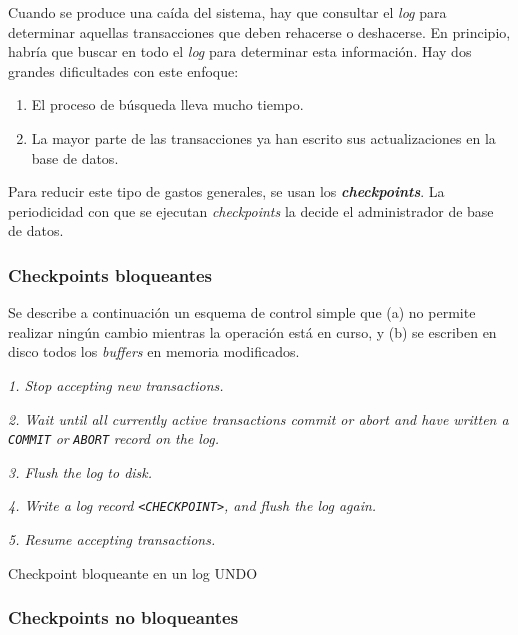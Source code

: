 \documentclass[a4paper, twoside]{article}
\begin{document}
Cuando se produce una caída del sistema, hay que consultar el \emph{log}
para determinar aquellas transacciones que deben rehacerse o deshacerse.
En principio, habría que buscar en todo el \emph{log} para determinar
esta información. Hay dos grandes dificultades con este enfoque: 
\begin{enumerate}
\item El proceso de búsqueda lleva mucho tiempo. 
\item La mayor parte de las transacciones ya han escrito sus actualizaciones
en la base de datos. 
\end{enumerate}
Para reducir este tipo de gastos generales, se usan los \textbf{\emph{checkpoints}}.
La periodicidad con que se ejecutan \emph{checkpoints} la decide el
administrador de base de datos.


\subsubsection{Checkpoints bloqueantes}

Se describe a continuación un esquema de control simple que (a) no
permite realizar ningún cambio mientras la operación está en curso,
y (b) se escriben en disco todos los \emph{buffers} en memoria modificados. 

\begin{algorithm}[H]
\emph{1. Stop accepting new transactions.}

\emph{2. Wait until all currently active transactions commit or abort
and have written a }\texttt{\emph{COMMIT}}\emph{ or }\texttt{\emph{ABORT}}\emph{
record on the log. }

\emph{3. Flush the log to disk. }

\emph{4. Write a log record }\texttt{\emph{<CHECKPOINT>}}\emph{, and
flush the log again. }

\emph{5. Resume accepting transactions.}

\protect\caption{Checkpoint bloqueante en un log UNDO}


\end{algorithm}



\subsubsection{Checkpoints no bloqueantes}
\end{document}
